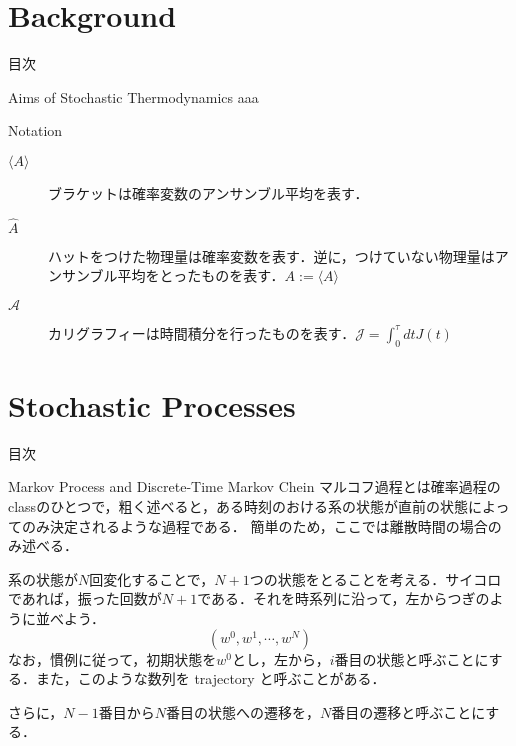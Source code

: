 \documentclass[aspectratio=169, dvipdfmx, 11pt,uplatex]{beamer} %
\begin{document}
\section{Background}

\begin{frame}{目次}
  \tableofcontents[currentsection]
\end{frame}

\begin{frame}{Aims of Stochastic Thermodynamics}
  aaa
\end{frame}

\begin{frame}{Notation }
  \begin{description}
    \item[$\langle A \rangle$] ブラケットは確率変数のアンサンブル平均を表す．
    \item[$\hat{A}$] ハットをつけた物理量は確率変数を表す．逆に，つけていない物理量はアンサンブル平均をとったものを表す．$A := \langle A \rangle $
    \item[$\mathcal{A}$] カリグラフィーは時間積分を行ったものを表す．$\mathcal{J} = \int_0^{\tau } dt J(t) $
  \end{description}
\end{frame}

\section{Stochastic Processes}

\begin{frame}{目次}
  \tableofcontents[currentsection]
\end{frame}

\begin{frame}{Markov Process and Discrete-Time Markov Chein}
  マルコフ過程とは確率過程のclassのひとつで，粗く述べると，ある時刻のおける系の状態が直前の状態によってのみ決定されるような過程である．
  簡単のため，ここでは離散時間の場合のみ述べる．\par
  系の状態が$N$回変化することで，$N+1$つの状態をとることを考える．サイコロであれば，振った回数が$N+1$である．それを時系列に沿って，左からつぎのように並べよう．
  \begin{equation}
    (w^0, w^1, \cdots, w^N)
  \end{equation}
  なお，慣例に従って，初期状態を$w^0$とし，左から，$i$番目の状態と呼ぶことにする．また，このような数列を trajectory と呼ぶことがある．\par
  さらに，$N-1$番目から$N$番目の状態への遷移を，$N$番目の遷移と呼ぶことにする．
\end{frame}
\end{document}
